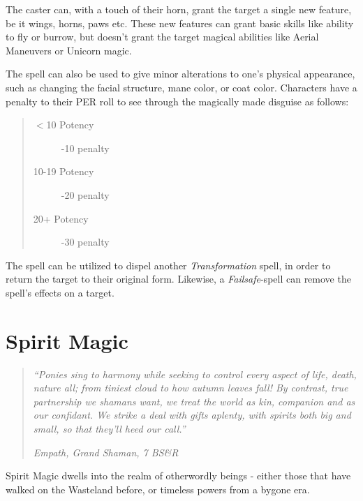\documentclass[11pt,a4paper,twocolumn]{book}
\begin{document}
The caster can, with a touch of their horn, grant the target a single new feature, be it wings, horns, paws etc. These new features can grant basic skills like ability to fly or burrow, but doesn't grant the target magical abilities like Aerial Maneuvers or Unicorn magic.

The spell can also be used to give minor alterations to one's physical appearance, such as changing the facial structure, mane color, or coat color. Characters have a penalty to their PER roll to see through the magically made disguise as follows:

\begin{quote}
	\begin{description}
		\item[$<$10 Potency] 	-10 penalty
		\item[10-19 Potency] 	-20 penalty
		\item[20+ Potency] 		-30 penalty
	\end{description}
\end{quote}

The spell can be utilized to dispel another \textit{Transformation} spell, in order to return the target to their original form. Likewise, a \textit{Failsafe}-spell can remove the spell's effects on a target.

\vfill


\chapter{Spirit Magic}

\begin{quote}
	\emph{``Ponies sing to harmony while seeking to control every aspect of life, death, nature all; from tiniest cloud to how autumn leaves fall! By contrast, true partnership we shamans want, we treat the world as kin, companion and as our confidant. We strike a deal with gifts aplenty, with spirits both big and small, so that they'll heed our call.''}
	
	\emph{ Empath, Grand Shaman, 7 BS\&R}
\end{quote}

Spirit Magic dwells into the realm of otherwordly beings - either those that have walked on the Wasteland before, or timeless powers from a bygone era. 
\end{document}
